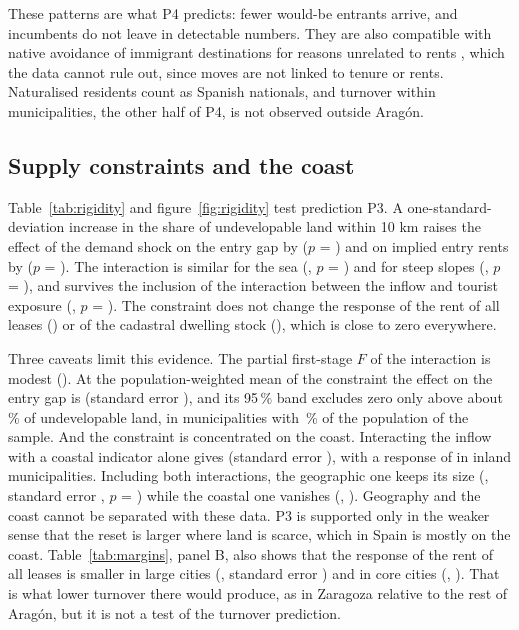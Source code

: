 \documentclass[11pt,a4paper]{article}
\begin{document}
These patterns are what P4 predicts: fewer would-be entrants arrive, and incumbents do not leave in detectable numbers. They are also compatible with native avoidance of immigrant destinations for reasons unrelated to rents \citep{card2001,saiz2011}, which the data cannot rule out, since moves are not linked to tenure or rents. Naturalised residents count as Spanish nationals, and turnover within municipalities, the other half of P4, is not observed outside Aragón.



\subsection{Supply constraints and the coast}

Table~\ref{tab:rigidity} and figure~\ref{fig:rigidity} test prediction P3. A one-standard-deviation increase in the share of undevelopable land within 10 km raises the effect of the demand shock on the entry gap by \rigB{} ($p$ = \rigP) and on implied entry rents by \rigEntry{} ($p$ = \rigEntryP). The interaction is similar for the sea (\rigSea, $p$ = \rigSeaP) and for steep slopes (\rigSteep, $p$ = \rigSteepP), and survives the inclusion of the interaction between the inflow and tourist exposure (\rigBt, $p$ = \rigPt). The constraint does not change the response of the rent of all leases (\rigStock) or of the cadastral dwelling stock (\rigViv), which is close to zero everywhere.

Three caveats limit this evidence. The partial first-stage $F$ of the interaction is modest (\rigFi). At the population-weighted mean of the constraint the effect on the entry gap is \rigBx{} (standard error \rigBxSe), and its 95\,\% band excludes zero only above about \rigThr\,\% of undevelopable land, in \rigThrN{} municipalities with \rigThrPop\,\% of the population of the sample. And the constraint is concentrated on the coast. Interacting the inflow with a coastal indicator alone gives \coastOnly{} (standard error \coastOnlySe), with a response of \coastOnlyX{} in inland municipalities. Including both interactions, the geographic one keeps its size (\gcU, standard error \gcUSe, $p$ = \gcUP) while the coastal one vanishes (\gcC, \gcCSe). Geography and the coast cannot be separated with these data. P3 is supported only in the weaker sense that the reset is larger where land is scarce, which in Spain is mostly on the coast. Table~\ref{tab:margins}, panel B, also shows that the response of the rent of all leases is smaller in large cities (\hetBigS, standard error \hetBigSse) and in core cities (\hetCoreS, \hetCoreSse). That is what lower turnover there would produce, as in Zaragoza relative to the rest of Aragón, but it is not a test of the turnover prediction.
\end{document}
